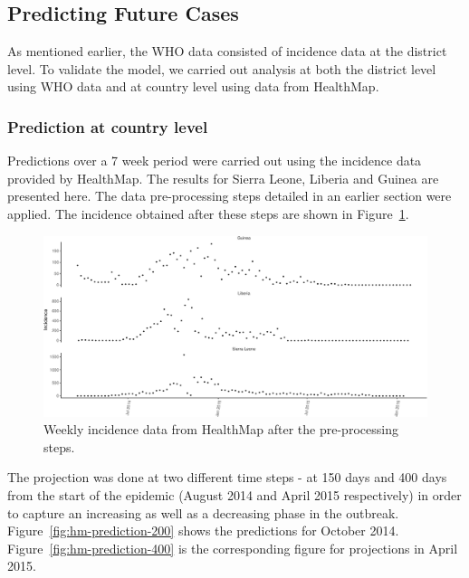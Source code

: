 \documentclass[11pt,]{article}
\begin{document}
\subsection{Predicting Future Cases}\label{predicting-future-cases}

As mentioned earlier, the WHO data consisted of incidence data at the district level. To
validate the model, we carried out analysis at both the district level
using WHO data and at country level using data from HealthMap.

\subsubsection{Prediction at country level}

Predictions over a 7 week period were carried out using the incidence
data provided by HealthMap. The results for Sierra Leone, Liberia and
Guinea are presented here. The data pre-processing steps detailed in
an earlier section were applied. The incidence obtained after these
steps are shown in Figure~\ref{fig:hm-incid}.

\begin{figure}
  \centering
  \includegraphics[]{ms6-figures/hm_weekly_incid-1}
  \caption{Weekly incidence data from HealthMap after the pre-processing
    steps.}
  \label{fig:hm-incid}
\end{figure}

The projection was done at two
different time steps - at 150 days and 400 days from the start of the
epidemic (August 2014 and April 2015
respectively) in order to capture an increasing as well as a
decreasing phase in the outbreak. Figure~\ref{fig:hm-prediction-200} shows the
predictions for October 2014. Figure~\ref{fig:hm-prediction-400} is
the corresponding figure for projections in April 2015.
\end{document}
